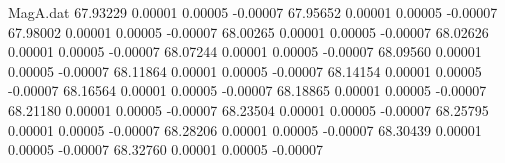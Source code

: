 \begin{filecontents}{MagA.dat}
  67.93229    0.00001    0.00005   -0.00007
  67.95652    0.00001    0.00005   -0.00007
  67.98002    0.00001    0.00005   -0.00007
  68.00265    0.00001    0.00005   -0.00007
  68.02626    0.00001    0.00005   -0.00007
  68.07244    0.00001    0.00005   -0.00007
  68.09560    0.00001    0.00005   -0.00007
  68.11864    0.00001    0.00005   -0.00007
  68.14154    0.00001    0.00005   -0.00007
  68.16564    0.00001    0.00005   -0.00007
  68.18865    0.00001    0.00005   -0.00007
  68.21180    0.00001    0.00005   -0.00007
  68.23504    0.00001    0.00005   -0.00007
  68.25795    0.00001    0.00005   -0.00007
  68.28206    0.00001    0.00005   -0.00007
  68.30439    0.00001    0.00005   -0.00007
  68.32760    0.00001    0.00005   -0.00007
\end{filecontents}
